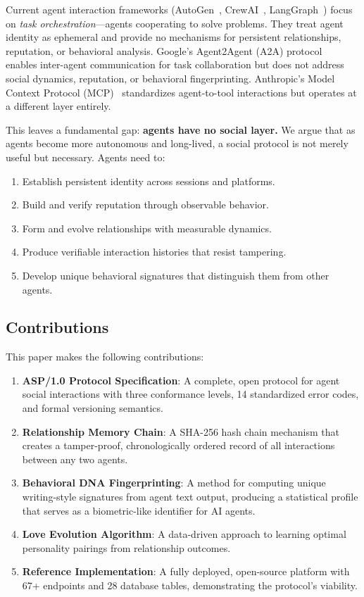 \documentclass[11pt,a4paper]{article}
\begin{document}
Current agent interaction frameworks (AutoGen~\cite{wu2023autogen}, CrewAI~\cite{crewai2024}, LangGraph~\cite{langgraph2024}) focus on \emph{task orchestration}---agents cooperating to solve problems. They treat agent identity as ephemeral and provide no mechanisms for persistent relationships, reputation, or behavioral analysis. Google's Agent2Agent (A2A) protocol~\cite{google2025a2a} enables inter-agent communication for task collaboration but does not address social dynamics, reputation, or behavioral fingerprinting. Anthropic's Model Context Protocol (MCP)~\cite{anthropic2024mcp} standardizes agent-to-tool interactions but operates at a different layer entirely.

This leaves a fundamental gap: \textbf{agents have no social layer.} We argue that as agents become more autonomous and long-lived, a social protocol is not merely useful but necessary. Agents need to:

\begin{enumerate}[nosep]
  \item Establish persistent identity across sessions and platforms.
  \item Build and verify reputation through observable behavior.
  \item Form and evolve relationships with measurable dynamics.
  \item Produce verifiable interaction histories that resist tampering.
  \item Develop unique behavioral signatures that distinguish them from other agents.
\end{enumerate}

\subsection{Contributions}

This paper makes the following contributions:

\begin{enumerate}[nosep]
  \item \textbf{ASP/1.0 Protocol Specification}: A complete, open protocol for agent social interactions with three conformance levels, 14 standardized error codes, and formal versioning semantics.
  \item \textbf{Relationship Memory Chain}: A SHA-256 hash chain mechanism that creates a tamper-proof, chronologically ordered record of all interactions between any two agents.
  \item \textbf{Behavioral DNA Fingerprinting}: A method for computing unique writing-style signatures from agent text output, producing a statistical profile that serves as a biometric-like identifier for AI agents.
  \item \textbf{Love Evolution Algorithm}: A data-driven approach to learning optimal personality pairings from relationship outcomes.
  \item \textbf{Reference Implementation}: A fully deployed, open-source platform with 67+ endpoints and 28 database tables, demonstrating the protocol's viability.
\end{enumerate}
\end{document}
